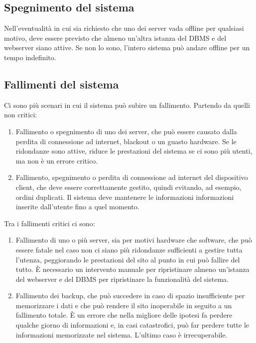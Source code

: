 \documentclass[12pt,a4paper]{article}
\begin{document}
\subsection{Spegnimento del sistema}
Nell'eventualità in cui sia richiesto che uno dei server vada offline per qualsiasi motivo, deve essere previsto che almeno un'altra istanza del DBMS e del webserver siano attive. Se non lo sono, l'intero sistema può andare offline per un tempo indefinito.

\subsection{Fallimenti del sistema}
Ci sono più scenari in cui il sistema può subire un fallimento. Partendo da quelli non critici:
\begin{enumerate}
\item Fallimento o spegnimento di uno dei server, che può essere causato dalla perdita di connessione ad internet, blackout o un guasto hardware. Se le ridondanze sono attive, riduce le prestazioni del sistema se ci sono più utenti, ma non è un errore critico.
\item Fallimento, spegnimento o perdita di connessione ad internet del dispositivo client, che deve essere correttamente gestito, quindi evitando, ad esempio, ordini duplicati. Il sistema deve mantenere le informazioni informazioni inserite dall'utente fino a quel momento.
\end{enumerate}

Tra i fallimenti critici ci sono:

\begin{enumerate}
\item Fallimento di uno o più server, sia per motivi hardware che software, che può essere fatale nel caso non ci siano più ridondanze sufficienti a gestire tutta l'utenza, peggiorando le prestazioni del sito al punto in cui può fallire del tutto. È necessario un intervento manuale per ripristinare almeno un'istanza del webserver e del DBMS per ripristinare la funzionalità del sistema.
\item Fallimento dei backup, che può succedere in caso di spazio insufficiente per memorizzare i dati e che può rendere il sito inoperabile in seguito a un fallimento totale. È un errore che nella migliore delle ipotesi fa perdere qualche giorno di informazioni e, in casi catastrofici, può far perdere tutte le informazioni memorizzate nel sistema. L'ultimo caso è irrecuperabile.
\end{enumerate}
\end{document}
